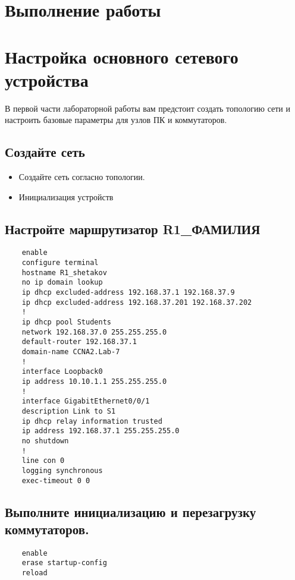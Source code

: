 \section*{\LARGE Выполнение работы}


\section{Настройка основного сетевого устройства}
В первой части лабораторной работы вам предстоит создать топологию сети и настроить базовые
параметры для узлов ПК и коммутаторов.

\subsection{Создайте сеть}
\begin{itemize}
    \item Создайте сеть согласно топологии.
    \item Инициализация устройств
\end{itemize}

\subsection{Настройте маршрутизатор R1\_ФАМИЛИЯ}
\begin{verbatim}
    enable
    configure terminal
    hostname R1_shetakov
    no ip domain lookup
    ip dhcp excluded-address 192.168.37.1 192.168.37.9
    ip dhcp excluded-address 192.168.37.201 192.168.37.202
    !
    ip dhcp pool Students
    network 192.168.37.0 255.255.255.0
    default-router 192.168.37.1
    domain-name CCNA2.Lab-7
    !
    interface Loopback0
    ip address 10.10.1.1 255.255.255.0
    !
    interface GigabitEthernet0/0/1
    description Link to S1
    ip dhcp relay information trusted
    ip address 192.168.37.1 255.255.255.0
    no shutdown
    !
    line con 0
    logging synchronous
    exec-timeout 0 0
\end{verbatim}

\subsection{Выполните инициализацию и перезагрузку коммутаторов. }
\begin{verbatim}
    enable
    erase startup-config
    reload
\end{verbatim}

